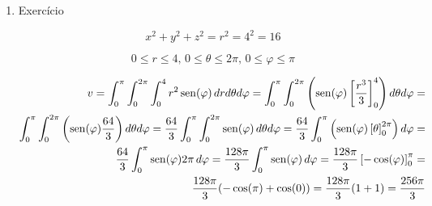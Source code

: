 \begin{enumerate}
	\item Exercício
	
	\begin{equation*}
		x^2 + y^2+ z^2 = r^2 = 4^2 = 16
	\end{equation*}
	
	
	\begin{equation*}
		0 \leq r \leq 4,\, 0 \leq \theta \leq 2\pi,\, 0 \leq \varphi \leq \pi
	\end{equation*}
	
	\begin{align*}
		v = \int_0^{\pi} \int_0^{2\pi} \int_0^4 r^2\operatorname{sen}(\varphi)\, dr d\theta d\varphi = \int_0^{\pi} \int_0^{2\pi}\left(\operatorname{sen}(\varphi)\left[\dfrac{r^3}{3}\right]_0^4\right)d\theta d\varphi =\\ \int_0^{\pi} \int_0^{2\pi}\left(\operatorname{sen}(\varphi)\dfrac{64}{3}\right)d\theta d\varphi = \dfrac{64}{3}\int_0^{\pi} \int_0^{2\pi}\operatorname{sen}(\varphi)\, d\theta d\varphi = \dfrac{64}{3} \int_0^{\pi} \left(\operatorname{sen}(\varphi)\left[\theta\right]_0^{2\pi}\right)d\varphi =\\ \dfrac{64}{3} \int_0^{\pi} \operatorname{sen}(\varphi) 2\pi\, d\varphi = \dfrac{128\pi}{3} \int_0^{\pi} \operatorname{sen}(\varphi)\, d\varphi = \dfrac{128\pi}{3} \left[-\cos(\varphi)\right]_0^{\pi} =\\ \dfrac{128\pi}{3} (-\cos(\pi) + \cos(0)) = \dfrac{128\pi}{3} (1 + 1) = \dfrac{256\pi}{3}
	\end{align*}
\end{enumerate}